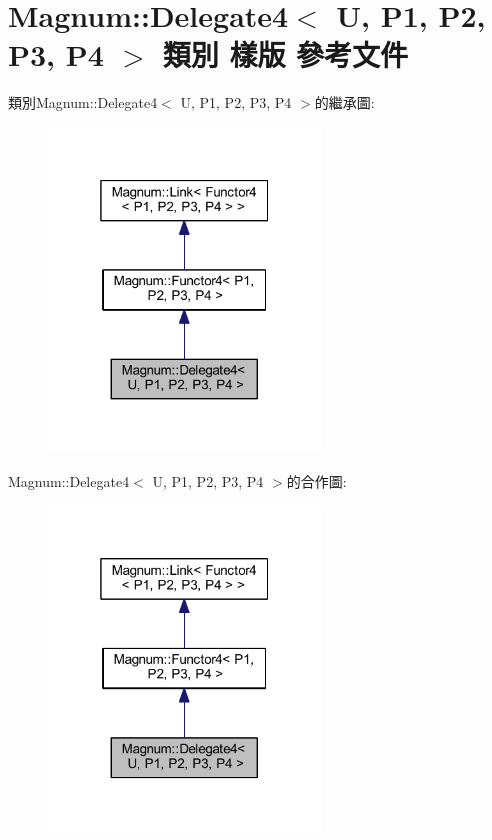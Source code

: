 \hypertarget{class_magnum_1_1_delegate4}{}\section{Magnum\+:\+:Delegate4$<$ U, P1, P2, P3, P4 $>$ 類別 樣版 參考文件}
\label{class_magnum_1_1_delegate4}


類別\+Magnum\+:\+:Delegate4$<$ U, P1, P2, P3, P4 $>$的繼承圖\+:\nopagebreak
\begin{figure}[H]
\begin{center}
\leavevmode
\includegraphics[width=205pt]{class_magnum_1_1_delegate4__inherit__graph}
\end{center}
\end{figure}


Magnum\+:\+:Delegate4$<$ U, P1, P2, P3, P4 $>$的合作圖\+:\nopagebreak
\begin{figure}[H]
\begin{center}
\leavevmode
\includegraphics[width=205pt]{class_magnum_1_1_delegate4__coll__graph}
\end{center}
\end{figure}
